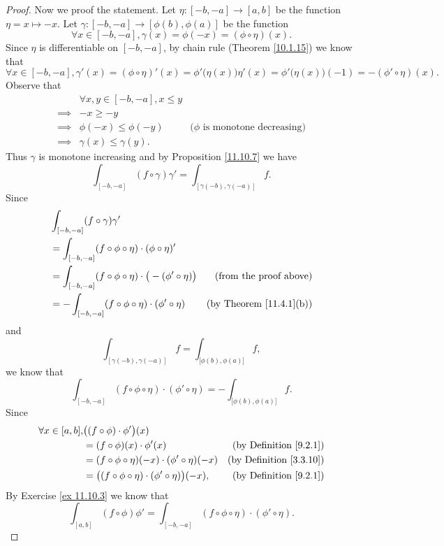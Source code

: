 \begin{proof}
    Now we proof the statement.
    Let \(\eta : [-b, -a] \to [a, b]\) be the function \(\eta = x \mapsto -x\).
    Let \(\gamma : [-b, -a] \to [\phi(b), \phi(a)]\) be the function
    \[
        \forall x \in [-b, -a], \gamma(x) = \phi(-x) = (\phi \circ \eta)(x).
    \]
    Since \(\eta\) is differentiable on \([-b, -a]\), by chain rule (Theorem \ref{10.1.15}) we know that
    \[
        \forall x \in [-b, -a], \gamma'(x) = (\phi \circ \eta)'(x) = \phi'\big(\eta(x)\big) \eta'(x) = \phi'\big(\eta(x)\big) (-1) = - (\phi' \circ \eta)(x).
    \]
    Observe that
    \begin{align*}
                 & \forall x, y \in [-b, -a], x \leq y                                            \\
        \implies & -x \geq -y                                                                     \\
        \implies & \phi(-x) \leq \phi(-y)              & \text{(\(\phi\) is monotone decreasing)} \\
        \implies & \gamma(x) \leq \gamma(y).
    \end{align*}
    Thus \(\gamma\) is monotone increasing and by Proposition \ref{11.10.7} we have
    \[
        \int_{[-b, -a]} (f \circ \gamma) \gamma' = \int_{[\gamma(-b), \gamma(-a)]} f.
    \]
    Since
    \begin{align*}
         & \int_{[-b, -a]} (f \circ \gamma) \gamma'                                                                              \\
         & = \int_{[-b, -a]} (f \circ \phi \circ \eta) \cdot (\phi \circ \eta)'                                                  \\
         & = \int_{[-b, -a]} (f \circ \phi \circ \eta) \cdot \big(-(\phi' \circ \eta)\big) & \text{(from the proof above)}       \\
         & = -\int_{[-b, -a]} (f \circ \phi \circ \eta) \cdot (\phi' \circ \eta)           & \text{(by Theorem \ref{11.4.1}(b))}
    \end{align*}
    and
    \[
        \int_{[\gamma(-b), \gamma(-a)]} f = \int_{\big[\phi(b), \phi(a)\big]} f,
    \]
    we know that
    \[
        \int_{[-b, -a]} (f \circ \phi \circ \eta) \cdot (\phi' \circ \eta) = -\int_{\big[\phi(b), \phi(a)\big]} f.
    \]
    Since
    \begin{align*}
        \forall x \in [a, b], & \big((f \circ \phi) \cdot \phi'\big)(x)                                                                   \\
                              & = (f \circ \phi)(x) \cdot \phi'(x)                                  & \text{(by Definition \ref{9.2.1})}  \\
                              & = (f \circ \phi \circ \eta)(-x) \cdot (\phi' \circ \eta)(-x)        & \text{(by Definition \ref{3.3.10})} \\
                              & = \big((f \circ \phi \circ \eta) \cdot (\phi' \circ \eta)\big)(-x), & \text{(by Definition \ref{9.2.1})}
    \end{align*}
    By Exercise \ref{ex 11.10.3} we know that
    \[
        \int_{[a, b]} (f \circ \phi) \phi' = \int_{[-b, -a]} (f \circ \phi \circ \eta) \cdot (\phi' \circ \eta).
    \]
\end{proof}
